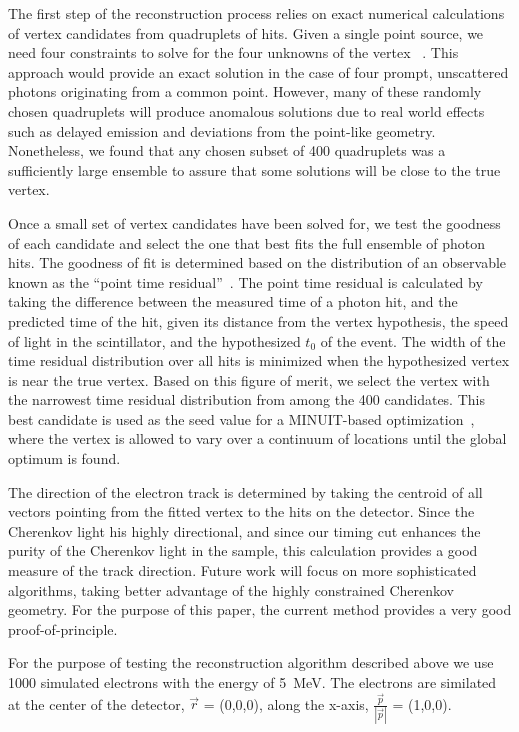 \documentclass[aps,prc,twocolumn,groupedaddress,showpacs,amsmath,amssymb,floatfix,superscriptaddress]{revtex4}
\begin{document}
The first step of the reconstruction process relies on exact numerical calculations of vertex candidates from quadruplets of hits. Given a single point source, we need four constraints to solve for the four unknowns of the vertex ~\cite{Smy}. This approach would provide an exact solution in the case of four prompt, unscattered photons originating from a common point. However, many of these randomly chosen quadruplets will produce anomalous solutions due to real world effects such as delayed emission and deviations from the point-like geometry. Nonetheless, we found that any chosen subset of 400 quadruplets was a sufficiently large ensemble to assure that some solutions will be close to the true vertex.

Once a small set of vertex candidates have been solved for, we test the goodness of each candidate and select the one that best fits the full ensemble of photon hits. The goodness of fit is determined based on the distribution of an observable known as the ``point time residual''~\cite{SuperKalgo}. The point time residual is calculated by taking the difference between the measured time of a photon hit, and the predicted time of the hit, given its distance from the vertex hypothesis, the speed of light in the scintillator, and the hypothesized $t_0$ of the event. The width of the time residual distribution over all hits is minimized when the hypothesized vertex is near the true vertex. Based on this figure of merit, we select the vertex with the narrowest time residual distribution from among the 400 candidates. This best candidate is used as the seed value for a MINUIT-based optimization~\cite{MINUIT}, where the vertex is allowed to vary over a continuum of locations until the global optimum is found.

The direction of the electron track is determined by taking the centroid of all vectors pointing from the fitted vertex to the hits on the detector. Since the Cherenkov light his highly directional, and since our timing cut enhances the purity of the Cherenkov light in the sample, this calculation provides a good measure of the track direction. Future work will focus on more sophisticated algorithms, taking better advantage of the highly constrained Cherenkov geometry. For the purpose of this paper, the current method provides a very good proof-of-principle.


For the purpose of testing the reconstruction algorithm described above we use 1000 simulated electrons with the energy of 5~MeV. The electrons are similated at the center of the detector, $\vec{r}$ = (0,0,0), along the x-axis, $\frac{\vec{p}}{|\vec{p}|}$ = (1,0,0).
\end{document}
